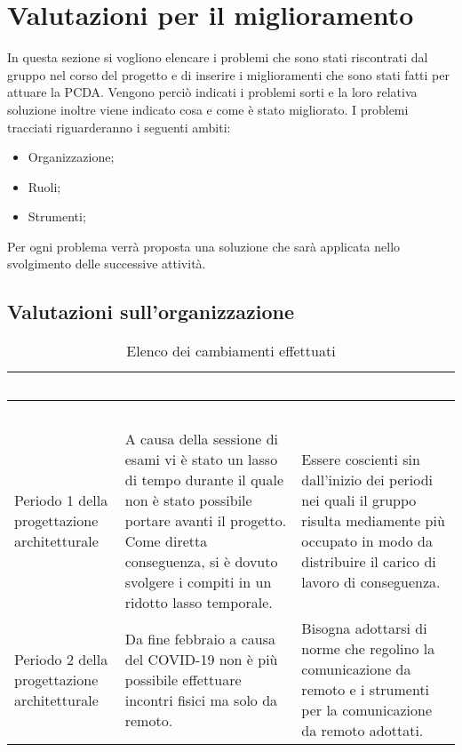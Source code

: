 \section{Valutazioni per il miglioramento}
In questa sezione si vogliono elencare i problemi che sono stati riscontrati dal gruppo nel corso del progetto e di inserire i miglioramenti che sono stati fatti per attuare la PCDA. Vengono perciò indicati i problemi sorti e la loro relativa soluzione inoltre viene indicato cosa e come è stato migliorato.
I problemi tracciati riguarderanno i seguenti ambiti:
\begin{itemize}
\item Organizzazione;
\item Ruoli;
\item Strumenti;
\end{itemize}
Per ogni problema verrà proposta una soluzione che sarà applicata nello svolgimento delle successive attività.

\subsection{Valutazioni sull'organizzazione}
{
	\renewcommand{\arraystretch}{1.5}
	\centering
	\begin{longtable}{ C{3cm} C{5.5cm} C{5.5cm}}
		\caption{Elenco dei cambiamenti effettuati}\\
		\textcolor{white}{\textbf{Periodo}} & \textcolor{white}{\textbf{Problema}} & \textcolor{white}{\textbf{Soluzione}}\\
		\endfirsthead
		\textcolor{white}{\textbf{Periodo}} & \textcolor{white}{\textbf{Problema}} & \textcolor{white}{\textbf{Soluzione}}\\
		\endhead
		Periodo 1 della progettazione architetturale & A causa della sessione di esami vi è stato un lasso di tempo durante il quale non è stato possibile portare avanti il progetto. Come diretta conseguenza, si è dovuto svolgere i compiti in un ridotto lasso temporale. & Essere coscienti sin dall'inizio dei periodi nei quali il gruppo risulta mediamente più occupato in modo da distribuire il carico di lavoro di conseguenza. \\
		
		Periodo 2 della progettazione architetturale & Da fine febbraio a causa del COVID-19 non è più possibile effettuare incontri fisici ma solo da remoto. & Bisogna adottarsi di norme che regolino la comunicazione da remoto e i strumenti per la comunicazione da remoto adottati. \\
		
	\end{longtable}
}



